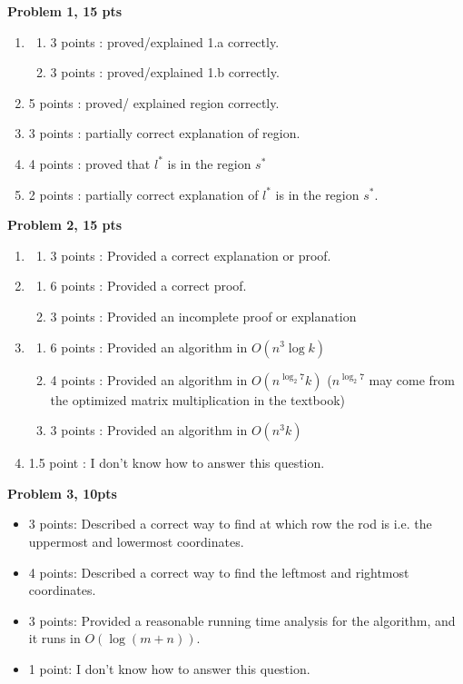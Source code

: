 \documentclass[11pt]{article}
\begin{document}
\begin{qunlist}
\bigskip
{\bf Problem 1, 15 pts}
\begin{enumerate}
    \item
    \begin{enumerate}
        \item 3 points : proved/explained 1.a correctly.
        \item 3 points : proved/explained 1.b correctly.
    \end{enumerate}
    \item 5 points : proved/ explained region correctly.
    \item 3 points : partially correct explanation of region.
    \item 4 points : proved that $l^*$ is in the region $s^*$
    \item 2 points : partially correct explanation of $l^*$ is in the region $s^*$.
\end{enumerate}


{\bf Problem 2, 15 pts}
\begin{enumerate}
    \item
    \begin{enumerate}
        \item 3 points : Provided a correct explanation or proof.
    \end{enumerate}
    \item
    \begin{enumerate}
        \item 6 points : Provided a correct proof.
        \item 3 points : Provided an incomplete proof or explanation
    \end{enumerate}
    \item
    \begin{enumerate}
        \item 6 points : Provided an algorithm in $O(n^3 \log k)$
        \item 4 points : Provided an algorithm in $O(n^{\log_2 7} k)$ ($n^{\log_2 7}$ may come from the optimized matrix multiplication in the textbook)
        \item 3 points : Provided an algorithm in $O(n^3 k)$
    \end{enumerate}
    \item 1.5 point : I don't know how to answer this question.
\end{enumerate}

{\bf Problem 3, 10pts}
\begin{itemize}
    \item 3 points: Described a correct way to find at which row the rod is i.e. the uppermost and lowermost coordinates.
    \item 4 points: Described a correct way to find the leftmost and rightmost coordinates.
    \item 3 points: Provided a reasonable running time analysis for the algorithm, and it runs in $O(\log (m + n))$.
    \item 1 point: I don't know how to answer this question.
\end{itemize}


\end{qunlist}
\end{document}
